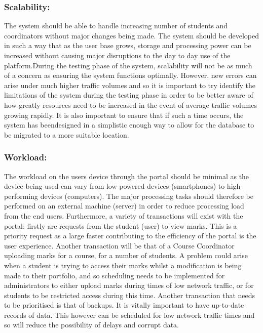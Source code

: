 \documentclass[paper=a4, fontsize=11pt]{scrartcl}
\numberwithin{equation}{section}		%
\numberwithin{figure}{section}			%
\numberwithin{table}{section}				%
\begin{document}
\subsubsection{Scalability:}
The system should be able to handle increasing number of students and coordinators
without major changes being made. The system should be developed in such a way that as
the user base grows, storage and processing power can be increased without causing major
disruptions to the day to day use of the platform.During the testing phase of the system,
scalability will not be as much of a concern as ensuring the system functions optimally.
However, new errors can arise under much higher traffic volumes and so it is important to try
identify the limitations of the system during the testing phase in order to be better aware of
how greatly resources need to be increased in the event of average traffic volumes growing
rapidly. It is also important to ensure that if such a time occurs, the system has beendesigned in a simplistic enough way to allow for the database to be migrated to a more
suitable location.

\subsubsection{Workload:}
The workload on the users device through the portal should be minimal as the device being
used can vary from low-powered devices (smartphones) to high-performing devices
(computers). The major processing tasks should therefore be performed on an external
machine (server) in order to reduce processing load from the end users. Furthermore, a
variety of transactions will exist with the portal: firstly are requests from the student (user) to
view marks. This is a priority request as a large faster contributing to the efficiency of the
portal is the user experience. Another transaction will be that of a Course Coordinator
uploading marks for a course, for a number of students. A problem could arise when a
student is trying to access their marks whilst a modification is being made to their portfolio,
and so scheduling needs to be implemented for administrators to either upload marks during
times of low network traffic, or for students to be restricted access during this time. Another
transaction that needs to be prioritised is that of backups. It is vitally important to have
up-to-date records of data. This however can be scheduled for low network traffic times and
so will reduce the possibility of delays and corrupt data.
\\
\end{document}
